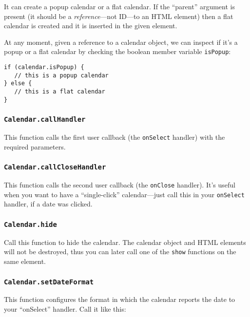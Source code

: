 \documentclass[a4paper,10pt]{article}
\begin{document}
It can create a popup calendar or a flat calendar.  If the ``parent'' argument
is present (it should be a \emph{reference}---not ID---to an HTML element) then
a flat calendar is created and it is inserted in the given element.

At any moment, given a reference to a calendar object, we can inspect if it's a
popup or a flat calendar by checking the boolean member variable
\texttt{isPopup}:

\begin{verbatim}
if (calendar.isPopup) {
   // this is a popup calendar
} else {
   // this is a flat calendar
}
\end{verbatim}

\subsubsection{\texttt{Calendar.callHandler}}\label{sec:Calendar.callHandler}

This function calls the first user callback (the
\texttt{onSelect} handler) with the required parameters.

\subsubsection{\texttt{Calendar.callCloseHandler}}\label{sec:Calendar.callCloseHandler}

This function calls the second user callback (the
\texttt{onClose} handler).  It's useful when you want to have a
``single-click'' calendar---just call this in your \texttt{onSelect} handler,
if a date was clicked.

\subsubsection{\texttt{Calendar.hide}}\label{sec:Calendar.hide}

Call this function to hide the calendar.  The calendar object and HTML elements
will not be destroyed, thus you can later call one of the \texttt{show}
functions on the same element.

\subsubsection{\texttt{Calendar.setDateFormat}}\label{sec:Calendar.setDateFormat}

This function configures the format in which the calendar reports the date to
your ``onSelect'' handler.  Call it like this:
\end{document}
